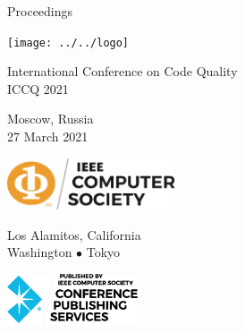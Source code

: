 \thispagestyle{empty}
\begin{center}
Proceedings

\vspace{1in}

\texttt{[image: ../../logo]}

\vspace{0.5in}

{\Large International Conference on Code Quality\\[12pt]
ICCQ 2021}

\vspace{0.5in}

Moscow, Russia\\
27 March 2021

\vspace{3in}

\begin{multicols}{3}
\includegraphics[height=0.6in]{../images/ieee-cs-logo}
\columnbreak

{\small Los Alamitos, California\\
Washington $\bullet$ Tokyo}

\columnbreak
\includegraphics[height=0.6in]{../images/ieee-cps-logo}
\end{multicols}
\end{center}
